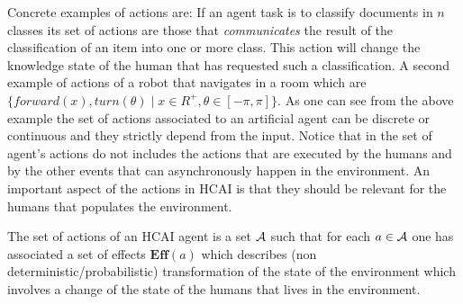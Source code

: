 Concrete examples of actions are: If an agent task is to classify
documents in $n$ classes its set of actions are those that
\emph{communicates} the result of the classification of an item into
one or more class. This action will change the knowledge state of the
human that has requested such a classification.  A second example of
actions of a robot that navigates in a room which are
$\{forward(x),turn(\theta) \mid x \in R^+, \theta \in [-\pi,\pi]\}$.
As one can see from the above example the set of actions associated to
an artificial agent can be discrete or continuous and they strictly
depend from the input. Notice that in the set of agent's actions do
not includes the actions that are executed by the humans and by the
other events that can asynchronously happen in the environment.  An
important aspect of the actions in HCAI is that they should be
relevant for the humans that populates the environment.

\def\effects{\mathbf{Eff}}
\begin{definition}
  The set of actions of an HCAI agent is a set
  $\mathcal{A}$ such that for each $a\in\mathcal{A}$ one has associated a
  set of effects $\effects(a)$ which describes (non
  deterministic/probabilistic) transformation of the state of the
  environment which involves a change of the state of the humans that
  lives in the environment. 
\end{definition}





